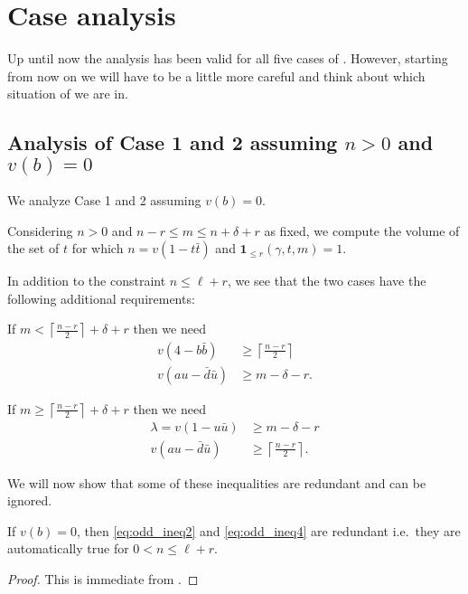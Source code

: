 \section{Case analysis}
Up until now the analysis has been valid for all five cases of
.
However, starting from now on we will have to be a little more careful
and think about which situation of  we are in.

\subsection{Analysis of Case 1 and 2 assuming $n > 0$ and $v(b) = 0$}
We analyze Case 1 and 2 assuming $v(b) = 0$.

Considering $n > 0$ and $n-r \le m \le n+\delta+r$ as fixed,
we compute the volume of the set of $t$
for which $n = v(1-t\bar t)$ and $\mathbf{1}_{\le r}(\gamma,t,m) = 1$.

In addition to the constraint $n \le \ell + r$,
we see that the two cases have the following additional requirements:
\begin{description}
  \ii[Case 1] If $m < \left\lceil \frac{n-r}{2} \right\rceil + \delta + r$ then we need
  \begin{align}
    v(4-b\bar b) &\ge \left\lceil \frac{n-r}{2} \right\rceil \label{eq:odd_ineq1} \\
    v(au - \bar d \bar u) &\ge m - \delta - r \label{eq:odd_ineq2}.
  \end{align}

  \ii[Case 2] If $m \geq \left\lceil \frac{n-r}{2} \right\rceil + \delta + r$ then we need
  \begin{align}
    \lambda = v(1-u \bar u) &\ge m-\delta-r \label{eq:odd_ineq3} \\
    v(au - \bar d \bar u) &\ge \left\lceil \frac{n-r}{2} \right\rceil \label{eq:odd_ineq4}.
  \end{align}
\end{description}

We will now show that some of these inequalities are redundant and can be ignored.
\begin{lemma}
  If $v(b) = 0$, then \eqref{eq:odd_ineq2} and \eqref{eq:odd_ineq4} are redundant
  i.e.\ they are automatically true for $0 < n \le \ell + r$.
\end{lemma}
\begin{proof}
  This is immediate from .
\end{proof}

